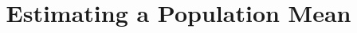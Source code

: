 \documentclass{beamer}
\title[MA205 - Section 7.2]{Estimating a Population Mean}
\begin{document}
\begin{frame}
\titlepage
\end{frame}
\end{document}
